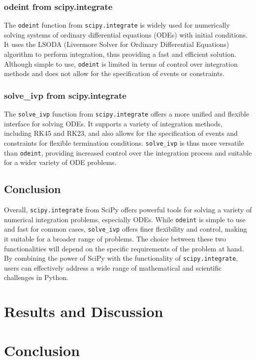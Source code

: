 \documentclass{article}
\begin{document}
\subsubsection{odeint from scipy.integrate}
The \texttt{odeint} function from \texttt{scipy.integrate} is widely used for numerically solving systems of ordinary differential equations (ODEs) with initial conditions. It uses the LSODA (Livermore Solver for Ordinary Differential Equations) algorithm to perform integration, thus providing a fast and efficient solution. Although simple to use, \texttt{odeint} is limited in terms of control over integration methods and does not allow for the specification of events or constraints.
\subsubsection{solve\_ivp from scipy.integrate}
The \texttt{solve\_ivp} function from \texttt{scipy.integrate} offers a more unified and flexible interface for solving ODEs. It supports a variety of integration methods, including RK45 and RK23, and also allows for the specification of events and constraints for flexible termination conditions. \texttt{solve\_ivp} is thus more versatile than \texttt{odeint}, providing increased control over the integration process and suitable for a wider variety of ODE problems.
\subsection{Conclusion}
Overall, \texttt{scipy.integrate} from SciPy offers powerful tools for solving a variety of numerical integration problems, especially ODEs. While \texttt{odeint} is simple to use and fast for common cases, \texttt{solve\_ivp} offers finer flexibility and control, making it suitable for a broader range of problems. The choice between these two functionalities will depend on the specific requirements of the problem at hand. By combining the power of SciPy with the functionality of \texttt{scipy.integrate}, users can effectively address a wide range of mathematical and scientific challenges in Python.

\section{Results and Discussion}


\section{Conclusion}



\end{document}
